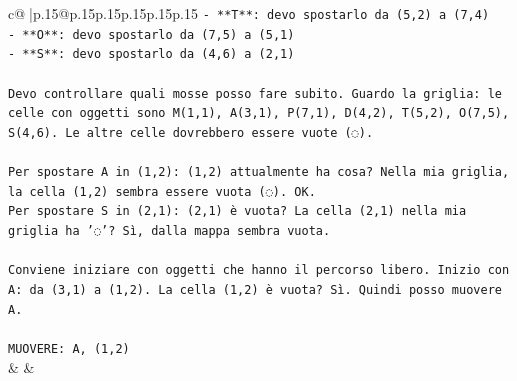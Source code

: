 \documentclass{article}
\begin{document}
{\begin{supertabular}{c@{$\;$}|p{.15\linewidth}@{}p{.15\linewidth}p{.15\linewidth}p{.15\linewidth}p{.15\linewidth}p{.15\linewidth}}
{{{\texttt{{-} **T**: devo spostarlo da (5,2) a (7,4)} \\
\texttt{{-} **O**: devo spostarlo da (7,5) a (5,1)} \\
\texttt{{-} **S**: devo spostarlo da (4,6) a (2,1)} \\
\\ 
\texttt{Devo controllare quali mosse posso fare subito. Guardo la griglia: le celle con oggetti sono M(1,1), A(3,1), P(7,1), D(4,2), T(5,2), O(7,5), S(4,6). Le altre celle dovrebbero essere vuote (◌).} \\
\\ 
\texttt{Per spostare A in (1,2): (1,2) attualmente ha cosa? Nella mia griglia, la cella (1,2) sembra essere vuota (◌). OK.} \\
\texttt{Per spostare S in (2,1): (2,1) è vuota? La cella (2,1) nella mia griglia ha '◌'? Sì, dalla mappa sembra vuota.} \\
\\ 
\texttt{Conviene iniziare con oggetti che hanno il percorso libero. Inizio con A: da (3,1) a (1,2). La cella (1,2) è vuota? Sì. Quindi posso muovere A.} \\
\\ 
\texttt{MUOVERE: A, (1,2)} \\
            }
        }
    }
    & & \\ \\


\end{supertabular}}
\end{document}
